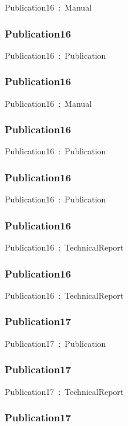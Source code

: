 \documentclass{article}
\begin{document}
Publication16~:~Manual

\subsubsection*{Publication16}

Publication16~:~Publication

\subsubsection*{Publication16}

Publication16~:~Manual

\subsubsection*{Publication16}

Publication16~:~Publication

\subsubsection*{Publication16}

Publication16~:~Publication

\subsubsection*{Publication16}

Publication16~:~TechnicalReport

\subsubsection*{Publication16}

Publication16~:~TechnicalReport

\subsubsection*{Publication17}

Publication17~:~Publication

\subsubsection*{Publication17}

Publication17~:~TechnicalReport

\subsubsection*{Publication17}
\end{document}
